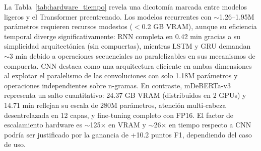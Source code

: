 \documentclass[paper=letter, fontsize=11pt, draft=false]{scrartcl}
\numberwithin{equation}{section} %
\numberwithin{figure}{section} %
\numberwithin{table}{section} %
\numberwithin{subsection}{section}
\begin{document}
La Tabla~\ref{tab:hardware_tiempo} revela una dicotomía marcada entre modelos ligeros y el Transformer preentrenado. Los modelos recurrentes con $\sim$1.26–1.95M parámetros requieren recursos modestos ($<$0.2 GB VRAM), aunque su eficiencia temporal diverge significativamente: RNN completa en 0.42 min gracias a su simplicidad arquitectónica (sin compuertas), mientras LSTM y GRU demandan $\sim$3 min debido a operaciones secuenciales no paralelizables en sus mecanismos de compuerta. CNN destaca como una arquitectura eficiente en ambas dimensiones al explotar el paralelismo de las convoluciones con solo 1.18M parámetros y operaciones independientes sobre n-gramas. En contraste, mDeBERTa-v3 representa un salto cuantitativo: 24.37 GB VRAM (distribuidos en 2 GPUs) y 14.71 min reflejan su escala de 280M parámetros, atención multi-cabeza desentrelazada en 12 capas, y fine-tuning completo con FP16. El factor de escalamiento hardware es $\sim$125× en VRAM y $\sim$26× en tiempo respecto a CNN podría ser justificado por la ganancia de +10.2 puntos F1, dependiendo del caso de uso.




\newpage
\end{document}
